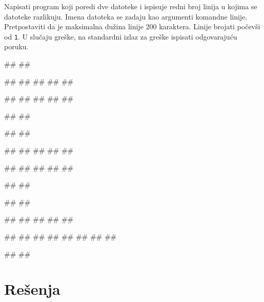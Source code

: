 \begin{Exercise}[label=p3_iv10]         
Napisati program koji poredi dve datoteke i ispisuje redni broj linija u
kojima se datoteke razlikuju. Imena datoteka se zadaju kao argumenti
komandne linije. Pretpostaviti da je maksimalna dužina
linije $200$ karaktera. Linije brojati počevši od {\tt 1}.
 U slučaju greške, na standardni izlaz za greške ispisati odgovarajuću poruku.

\begin{minitest}
\begin{upotreba}{1}
#\naslovPokretanje#
##

##
##
##
##
##

##
##
##
##
##

#\naslovIzlaz#
#\izlaz{}#
\end{upotreba}
\end{minitest}
\begin{minitest}
\begin{upotreba}{2}
#\naslovPokretanje#
##

##
##
##
##
##

##
##
##
##
##

#\naslovIzlaz#
##
\end{upotreba}
\end{minitest}
\begin{minitest}
\begin{upotreba}{3}
#\naslovPokretanje#
##

##
##
##
##
##

##
##
##
##
##
##
##
##

#\naslovIzlaz#
##
\end{upotreba}
\end{minitest}

\end{Exercise}
\begin{Answer}[ref=p3_iv10]
\end{Answer}




\section{Rešenja}


\shipoutAnswer


